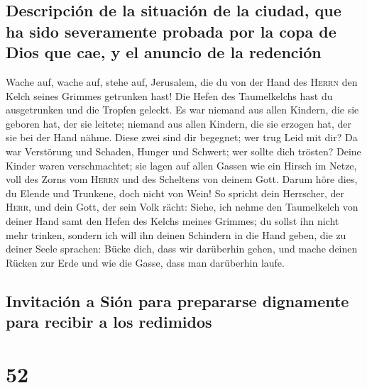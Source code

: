 \hypertarget{descripciuxf3n-de-la-situaciuxf3n-de-la-ciudad-que-ha-sido-severamente-probada-por-la-copa-de-dios-que-cae-y-el-anuncio-de-la-redenciuxf3n}{%
\subsection{Descripción de la situación de la ciudad, que ha sido
severamente probada por la copa de Dios que cae, y el anuncio de la
redención}\label{descripciuxf3n-de-la-situaciuxf3n-de-la-ciudad-que-ha-sido-severamente-probada-por-la-copa-de-dios-que-cae-y-el-anuncio-de-la-redenciuxf3n}}

 Wache auf, wache auf, stehe auf, Jerusalem, die du von
der Hand des \textsc{Herrn} den Kelch seines Grimmes getrunken hast! Die
Hefen des Taumelkelchs hast du ausgetrunken und die Tropfen geleckt.
 Es war niemand aus allen Kindern, die sie geboren hat,
der sie leitete; niemand aus allen Kindern, die sie erzogen hat, der sie
bei der Hand nähme.  Diese zwei sind dir begegnet; wer
trug Leid mit dir? Da war Verstörung und Schaden, Hunger und Schwert;
wer sollte dich trösten?  Deine Kinder waren
verschmachtet; sie lagen auf allen Gassen wie ein Hirsch im Netze, voll
des Zorns vom \textsc{Herrn} und des Scheltens von deinem Gott.
 Darum höre dies, du Elende und Trunkene, doch nicht von
Wein!  So spricht dein Herrscher, der \textsc{Herr}, und
dein Gott, der sein Volk rächt: Siehe, ich nehme den Taumelkelch von
deiner Hand samt den Hefen des Kelchs meines Grimmes; du sollst ihn
nicht mehr trinken,  sondern ich will ihn deinen
Schindern in die Hand geben, die zu deiner Seele sprachen: Bücke dich,
dass wir darüberhin gehen, und mache deinen Rücken zur Erde und wie die
Gasse, dass man darüberhin laufe.

\hypertarget{invitaciuxf3n-a-siuxf3n-para-prepararse-dignamente-para-recibir-a-los-redimidos}{%
\subsection{Invitación a Sión para prepararse dignamente para recibir a
los
redimidos}\label{invitaciuxf3n-a-siuxf3n-para-prepararse-dignamente-para-recibir-a-los-redimidos}}

\hypertarget{section-51}{%
\section{52}\label{section-51}}


